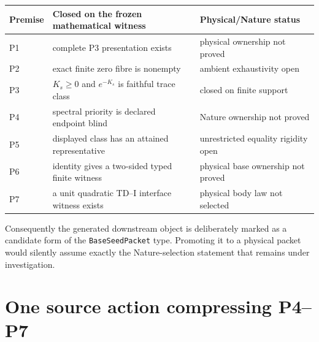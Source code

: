 \documentclass[11pt,a4paper]{article}
\theoremstyle{remark}
\begin{document}
\begin{center}
\small
\begin{tabularx}{\linewidth}{@{}lXX@{}}
\toprule
Premise & Closed on the frozen mathematical witness & Physical/Nature status\\
\midrule
P1 & complete P3 presentation exists & physical ownership not proved\\
P2 & exact finite zero fibre is nonempty & ambient exhaustivity open\\
P3 & $K_s\ge0$ and $e^{-K_s}$ is faithful trace class & closed on finite support\\
P4 & spectral priority is declared endpoint blind & Nature ownership not proved\\
P5 & displayed class has an attained representative & unrestricted equality rigidity open\\
P6 & identity gives a two-sided typed finite witness & physical base ownership not proved\\
P7 & a unit quadratic TD--I interface witness exists & physical body law not selected\\
\bottomrule
\end{tabularx}
\end{center}

Consequently the generated downstream object is deliberately marked as a
candidate form of the \texttt{BaseSeedPacket} type.  Promoting it to a physical
packet would silently assume exactly the Nature-selection statement that
remains under investigation.

\section{One source action compressing P4--P7}
\end{document}
